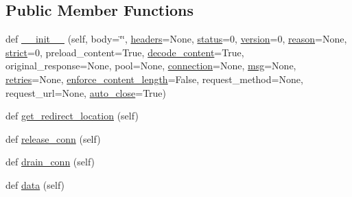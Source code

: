 \subsection*{Public Member Functions}
\begin{DoxyCompactItemize}
\item 
def \hyperlink{classpip_1_1__vendor_1_1urllib3_1_1response_1_1HTTPResponse_a15818d4ff92c8cb5263ed82d41590a5b}{\+\_\+\+\_\+init\+\_\+\+\_\+} (self, body=\char`\"{}\char`\"{}, \hyperlink{classpip_1_1__vendor_1_1urllib3_1_1response_1_1HTTPResponse_a97aabd98d1005d93e6b28dc90079c103}{headers}=None, \hyperlink{classpip_1_1__vendor_1_1urllib3_1_1response_1_1HTTPResponse_abb4b68e446ded37f5dd525479a03e1fa}{status}=0, \hyperlink{classpip_1_1__vendor_1_1urllib3_1_1response_1_1HTTPResponse_ab3339932611c370ff5995941d5719307}{version}=0, \hyperlink{classpip_1_1__vendor_1_1urllib3_1_1response_1_1HTTPResponse_a3453f7b7594608da4f5c48c4826cc22a}{reason}=None, \hyperlink{classpip_1_1__vendor_1_1urllib3_1_1response_1_1HTTPResponse_a9a7271c6578247ee75f5d45c38748224}{strict}=0, preload\+\_\+content=True, \hyperlink{classpip_1_1__vendor_1_1urllib3_1_1response_1_1HTTPResponse_a549e8dc33482f73e462d07d9816ab257}{decode\+\_\+content}=True, original\+\_\+response=None, pool=None, \hyperlink{classpip_1_1__vendor_1_1urllib3_1_1response_1_1HTTPResponse_a27a88449c366048b39e0a46f78381f1a}{connection}=None, \hyperlink{classpip_1_1__vendor_1_1urllib3_1_1response_1_1HTTPResponse_a92c2244c3b2203137beceafc12392502}{msg}=None, \hyperlink{classpip_1_1__vendor_1_1urllib3_1_1response_1_1HTTPResponse_a3d94baaf4a85948efe585d958b548801}{retries}=None, \hyperlink{classpip_1_1__vendor_1_1urllib3_1_1response_1_1HTTPResponse_ac76d60165511ffc85e85713d6e9fbd54}{enforce\+\_\+content\+\_\+length}=False, request\+\_\+method=None, request\+\_\+url=None, \hyperlink{classpip_1_1__vendor_1_1urllib3_1_1response_1_1HTTPResponse_a6d44c2eca87a45b0d06ffc4461ac053f}{auto\+\_\+close}=True)
\item 
def \hyperlink{classpip_1_1__vendor_1_1urllib3_1_1response_1_1HTTPResponse_a61378a4d8b722aaab89b2c87d71298ca}{get\+\_\+redirect\+\_\+location} (self)
\item 
def \hyperlink{classpip_1_1__vendor_1_1urllib3_1_1response_1_1HTTPResponse_a0286cdd53c6979c3da72c36668749757}{release\+\_\+conn} (self)
\item 
def \hyperlink{classpip_1_1__vendor_1_1urllib3_1_1response_1_1HTTPResponse_a7f5a270331ea4e54ce293b04be44cce6}{drain\+\_\+conn} (self)
\item 
def \hyperlink{classpip_1_1__vendor_1_1urllib3_1_1response_1_1HTTPResponse_a6e7ac6d6d58cacbce67ec13daeedeb7c}{data} (self)

\end{DoxyCompactItemize}
